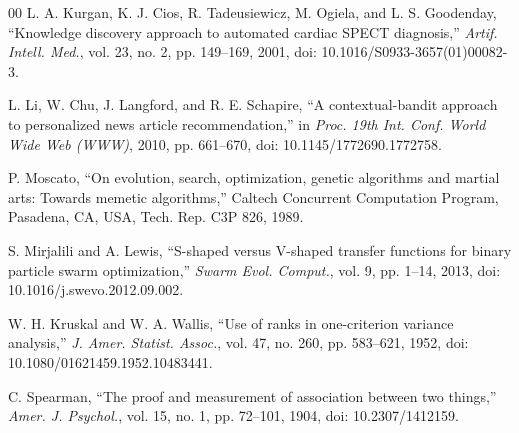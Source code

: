 \begin{thebibliography}{00}
 L. A. Kurgan, K. J. Cios, R. Tadeusiewicz, M. Ogiela, and L. S. Goodenday, ``Knowledge discovery approach to automated cardiac SPECT diagnosis,'' \textit{Artif. Intell. Med.}, vol. 23, no. 2, pp. 149--169, 2001, doi: 10.1016/S0933-3657(01)00082-3.

 L. Li, W. Chu, J. Langford, and R. E. Schapire, ``A contextual-bandit approach to personalized news article recommendation,'' in \textit{Proc. 19th Int. Conf. World Wide Web (WWW)}, 2010, pp. 661--670, doi: 10.1145/1772690.1772758.

 P. Moscato, ``On evolution, search, optimization, genetic algorithms and martial arts: Towards memetic algorithms,'' Caltech Concurrent Computation Program, Pasadena, CA, USA, Tech. Rep. C3P 826, 1989.

 S. Mirjalili and A. Lewis, ``S-shaped versus V-shaped transfer functions for binary particle swarm optimization,'' \textit{Swarm Evol. Comput.}, vol. 9, pp. 1--14, 2013, doi: 10.1016/j.swevo.2012.09.002.

 W. H. Kruskal and W. A. Wallis, ``Use of ranks in one-criterion variance analysis,'' \textit{J. Amer. Statist. Assoc.}, vol. 47, no. 260, pp. 583--621, 1952, doi: 10.1080/01621459.1952.10483441.

 C. Spearman, ``The proof and measurement of association between two things,'' \textit{Amer. J. Psychol.}, vol. 15, no. 1, pp. 72--101, 1904, doi: 10.2307/1412159.

\end{thebibliography}
